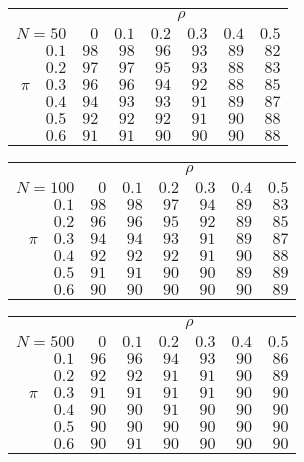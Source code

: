 \begin{tabular}{r|rrrrrr}
\hline\hline
 &\multicolumn{6}{c}{$\rho$} \\ 
 $N = 50$ & $0$ & $0.1$ & $0.2$ & $0.3$ & $0.4$ & $0.5$ \\ 
 \hline$0.1$ & $98$ & $98$ & $96$ & $93$ & $89$ & $82$\\ 
$0.2$ & $97$ & $97$ & $95$ & $93$ & $88$ & $83$\\ 
$\pi\quad$$0.3$ & $96$ & $96$ & $94$ & $92$ & $88$ & $85$\\ 
$0.4$ & $94$ & $93$ & $93$ & $91$ & $89$ & $87$\\ 
$0.5$ & $92$ & $92$ & $92$ & $91$ & $90$ & $88$\\ 
$0.6$ & $91$ & $91$ & $90$ & $90$ & $90$ & $88$\\ 
 \hline 
 \end{tabular}
 
 \vspace{2em} 
 
\begin{tabular}{r|rrrrrr}
\hline\hline
 &\multicolumn{6}{c}{$\rho$} \\ 
 $N = 100$ & $0$ & $0.1$ & $0.2$ & $0.3$ & $0.4$ & $0.5$ \\ 
 \hline$0.1$ & $98$ & $98$ & $97$ & $94$ & $89$ & $83$\\ 
$0.2$ & $96$ & $96$ & $95$ & $92$ & $89$ & $85$\\ 
$\pi\quad$$0.3$ & $94$ & $94$ & $93$ & $91$ & $89$ & $87$\\ 
$0.4$ & $92$ & $92$ & $92$ & $91$ & $90$ & $88$\\ 
$0.5$ & $91$ & $91$ & $90$ & $90$ & $89$ & $89$\\ 
$0.6$ & $90$ & $90$ & $90$ & $90$ & $90$ & $89$\\ 
 \hline 
 \end{tabular}
 
 \vspace{2em} 
 
\begin{tabular}{r|rrrrrr}
\hline\hline
 &\multicolumn{6}{c}{$\rho$} \\ 
 $N = 500$ & $0$ & $0.1$ & $0.2$ & $0.3$ & $0.4$ & $0.5$ \\ 
 \hline$0.1$ & $96$ & $96$ & $94$ & $93$ & $90$ & $86$\\ 
$0.2$ & $92$ & $92$ & $91$ & $91$ & $90$ & $89$\\ 
$\pi\quad$$0.3$ & $91$ & $91$ & $91$ & $91$ & $90$ & $90$\\ 
$0.4$ & $90$ & $90$ & $91$ & $90$ & $90$ & $90$\\ 
$0.5$ & $90$ & $90$ & $90$ & $90$ & $90$ & $90$\\ 
$0.6$ & $90$ & $91$ & $90$ & $90$ & $90$ & $90$\\ 
 \hline 
 \end{tabular}